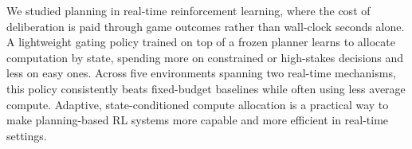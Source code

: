 We studied planning in real-time reinforcement learning, where the cost
of deliberation is paid through game outcomes rather than wall-clock
seconds alone. A lightweight gating policy trained on top of a frozen
planner learns to allocate computation by state, spending more on
constrained or high-stakes decisions and less on easy ones. Across five
environments spanning two real-time mechanisms, this policy
consistently beats fixed-budget baselines while often using less
average compute. Adaptive, state-conditioned compute allocation is a
practical way to make planning-based RL systems more capable and more
efficient in real-time settings.


\begin{ack}
\end{ack}







